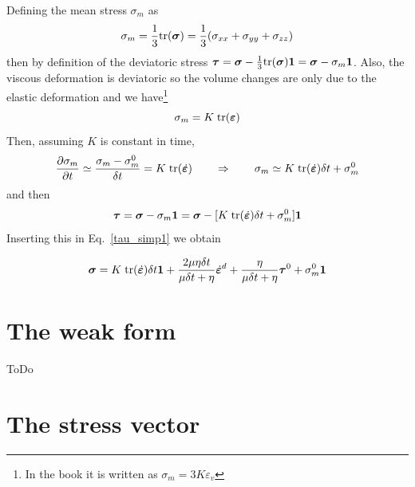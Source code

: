 Defining the mean stress $\sigma_m$ as
\[
\sigma_m = \frac13 {\rm tr}({\bm \sigma})=\frac13(\sigma_{xx}+\sigma_{yy}+\sigma_{zz})
\]
then by definition of the deviatoric stress 
$\bm\tau = {\bm \sigma} - \frac13 {\rm tr}({\bm \sigma}) {\bm 1}= \bm\sigma -\sigma_m {\bm 1} $. 
Also, the viscous deformation is deviatoric so the volume changes
are only due to the elastic deformation and we have\footnote{
In the book it is written as $\sigma_m = 3K \varepsilon_v $}
\[
\sigma_m 
= K \; {\rm tr}({\bm\varepsilon})
\]
Then, assuming $K$ is constant in time,
\[
\frac{\partial\sigma_m}{\partial t} 
\simeq 
\frac{\sigma_m - \sigma_m^0}{\delta t}
= K \; {\rm tr}(\dot{\bm\varepsilon})
\qquad
\Rightarrow
\qquad
\sigma_m \simeq K \; {\rm tr}(\dot{\bm\varepsilon}) \delta t + \sigma_m^0
\]
and then
\[
\bm\tau = \bm\sigma -\sigma_m {\bm 1} 
= \bm\sigma - [K \;  {\rm tr}(\dot{\bm\varepsilon}) \delta t + \sigma_m^0] {\bm 1}
\]
Inserting this in Eq.~\eqref{tau_simp1}
we obtain 
\begin{mdframed}[backgroundcolor=blue!5]
\begin{equation}
\bm \sigma 
= K \; {\rm tr}(\dot{\bm\varepsilon}) \delta t {\bm 1}  +
\frac{2 \mu \eta\delta t}{ \mu\delta t +\eta} \dot{\bm\varepsilon}^d +
\frac{ \eta}{\mu\delta t + \eta}  \bm\tau^0 + \sigma_m^0 {\bm 1}
\label{f129:eq:sigma}
\end{equation}
\end{mdframed}

\section{The weak form}

ToDo







\section{The stress vector}

